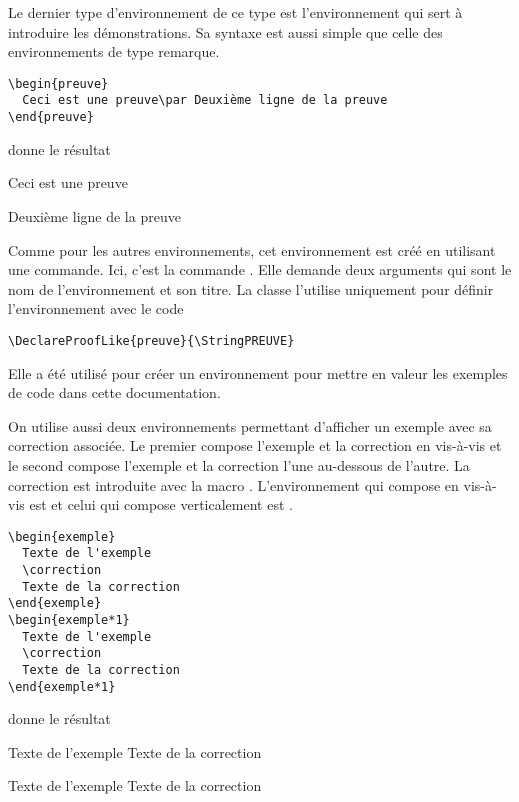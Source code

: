\documentclass[nocrop]{sesamanuel}
\begin{document}
\renewcommand{\StringDOCUMENTATION}{Preuve}
\begin{documentation}
Le dernier type d'environnement de ce type est l'environnement
 qui sert à introduire les démonstrations. Sa syntaxe
est aussi simple que celle des environnements de type remarque. 
\end{documentation}
\begin{code}
\begin{verbatim}
\begin{preuve}
  Ceci est une preuve\par Deuxième ligne de la preuve
\end{preuve}
\end{verbatim}
\end{code}
donne le résultat
\begin{preuve}
  Ceci est une preuve\par Deuxième ligne de la preuve
\end{preuve}

Comme pour les autres environnements, cet environnement est créé en
utilisant une commande. Ici, c'est la commande
. Elle demande deux arguments qui sont le nom de
l'environnement et son titre. La classe l'utilise uniquement pour
définir l'environnement  avec le code
\begin{verbatim}
\DeclareProofLike{preuve}{\StringPREUVE}
\end{verbatim}

Elle a été utilisé pour créer un environnement  pour mettre en valeur les exemples de code dans cette documentation. 

\renewcommand{\StringDOCUMENTATION}{Exemple}
\begin{documentation}
On utilise aussi deux environnements permettant d'afficher un exemple
avec sa correction associée. Le premier compose l'exemple et la
correction en vis-à-vis et le second compose l'exemple et la
correction l'une au-dessous de l'autre. La correction est introduite
avec la macro . L'environnement qui compose en
vis-à-vis est  et celui qui compose verticalement est
. 
\end{documentation}
\begin{code}
\begin{multicols}{2}
\begin{verbatim}
\begin{exemple}
  Texte de l'exemple
  \correction
  Texte de la correction
\end{exemple}
\begin{exemple*1}
  Texte de l'exemple
  \correction
  Texte de la correction
\end{exemple*1}
\end{verbatim}
\end{multicols}
\end{code}
donne le résultat
\begin{exemple}
  Texte de l'exemple
  \correction
  Texte de la correction
\end{exemple}
\begin{exemple*1}
  Texte de l'exemple
  \correction
  Texte de la correction
\end{exemple*1}
\end{document}
